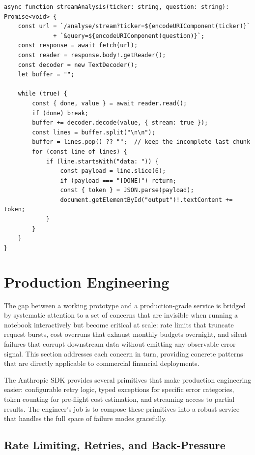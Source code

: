 \begin{verbatim}
async function streamAnalysis(ticker: string, question: string): Promise<void> {
    const url = `/analyse/stream?ticker=${encodeURIComponent(ticker)}`
              + `&query=${encodeURIComponent(question)}`;
    const response = await fetch(url);
    const reader = response.body!.getReader();
    const decoder = new TextDecoder();
    let buffer = "";

    while (true) {
        const { done, value } = await reader.read();
        if (done) break;
        buffer += decoder.decode(value, { stream: true });
        const lines = buffer.split("\n\n");
        buffer = lines.pop() ?? "";  // keep the incomplete last chunk
        for (const line of lines) {
            if (line.startsWith("data: ")) {
                const payload = line.slice(6);
                if (payload === "[DONE]") return;
                const { token } = JSON.parse(payload);
                document.getElementById("output")!.textContent += token;
            }
        }
    }
}
\end{verbatim}

\section{Production Engineering}
\label{app:sdk-commercial:production}

The gap between a working prototype and a production-grade service is bridged by
systematic attention to a set of concerns that are invisible when running a notebook
interactively but become critical at scale: rate limits that truncate request bursts,
cost overruns that exhaust monthly budgets overnight, and silent failures that corrupt
downstream data without emitting any observable error signal. This section addresses
each concern in turn, providing concrete patterns that are directly applicable to
commercial financial deployments.

The Anthropic SDK provides several primitives that make production engineering easier:
configurable retry logic, typed exceptions for specific error categories, token
counting for pre-flight cost estimation, and streaming access to partial results.
The engineer's job is to compose these primitives into a robust service that handles
the full space of failure modes gracefully.

\subsection{Rate Limiting, Retries, and Back-Pressure}
\label{app:sdk-commercial:production:rate-limits}

